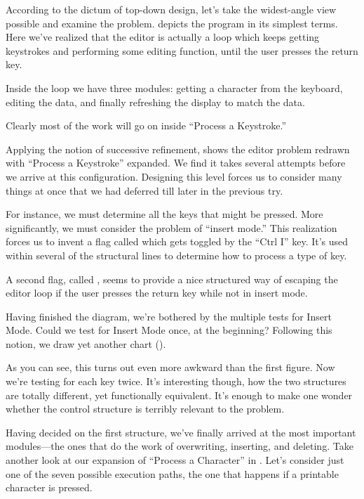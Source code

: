 According to the dictum of top-down design, let's take the
widest-angle view possible and examine the problem.  
depicts the program in its simplest terms. Here we've realized that
the editor is actually a loop which keeps getting keystrokes and
performing some editing function, until the user presses the return
key.

Inside the loop we have three modules: getting a character from the
keyboard, editing the data, and finally refreshing the display to match
the data.

Clearly most of the work will go on inside ``Process a Keystroke.''

Applying the notion of successive refinement,  shows the
editor problem redrawn with ``Process a Keystroke'' expanded. We find it
takes several attempts before we arrive at this configuration. Designing
this level forces us to consider many things at once that we had deferred
till later in the previous try.


For instance, we must determine all the keys that might be pressed.
More significantly, we must consider the problem of ``insert mode.'' This
realization forces us to invent a flag called  which gets
toggled by the ``Ctrl I'' key. It's used within several of the structural
lines to determine how to process a type of key.

A second flag, called , seems to provide a nice structured
way of escaping the editor loop if the user presses the return key while
not in insert mode.

Having finished the diagram, we're bothered by the multiple tests
for Insert Mode. Could we test for Insert Mode once, at the beginning?
Following this notion, we draw yet another chart ().

As you can see, this turns out even more awkward than the first
figure. Now we're testing for each key twice. It's interesting though,
how the two structures are totally different, yet functionally
equivalent. It's enough to make one wonder whether the control
structure is terribly relevant to the problem.


Having decided on the first structure, we've finally arrived at the
most important modules---the ones that do the work of overwriting,
inserting, and deleting. Take another look at our expansion of
``Process a Character'' in . Let's consider just one of the
seven possible execution paths, the one that happens if a printable
character is pressed.

